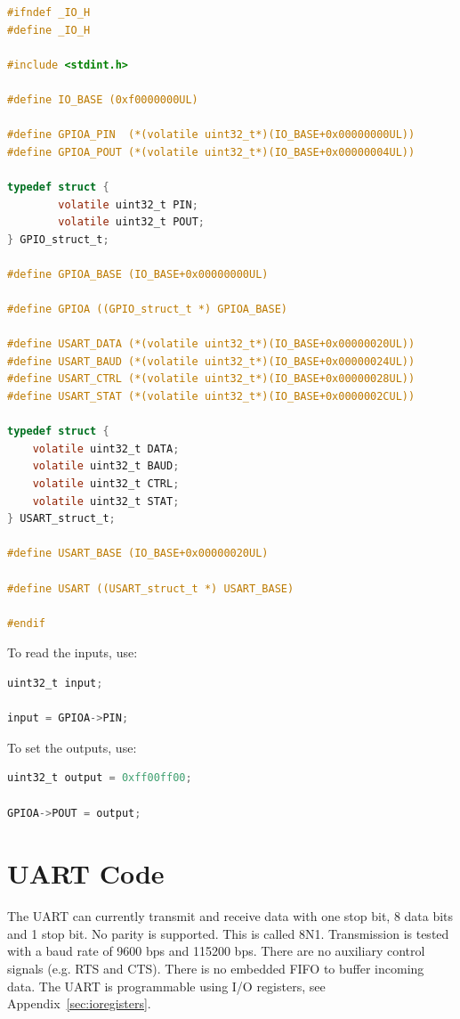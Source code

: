 \documentclass[12pt]{article}
\begin{document}
\begin{lstlisting}[language=C]
#ifndef _IO_H
#define _IO_H

#include <stdint.h>

#define IO_BASE (0xf0000000UL)

#define GPIOA_PIN  (*(volatile uint32_t*)(IO_BASE+0x00000000UL))
#define GPIOA_POUT (*(volatile uint32_t*)(IO_BASE+0x00000004UL))

typedef struct {
        volatile uint32_t PIN;
        volatile uint32_t POUT;
} GPIO_struct_t;

#define GPIOA_BASE (IO_BASE+0x00000000UL)

#define GPIOA ((GPIO_struct_t *) GPIOA_BASE)

#define USART_DATA (*(volatile uint32_t*)(IO_BASE+0x00000020UL))
#define USART_BAUD (*(volatile uint32_t*)(IO_BASE+0x00000024UL))
#define USART_CTRL (*(volatile uint32_t*)(IO_BASE+0x00000028UL))
#define USART_STAT (*(volatile uint32_t*)(IO_BASE+0x0000002CUL))

typedef struct {
	volatile uint32_t DATA;
	volatile uint32_t BAUD;
	volatile uint32_t CTRL;
	volatile uint32_t STAT;
} USART_struct_t;

#define USART_BASE (IO_BASE+0x00000020UL)

#define USART ((USART_struct_t *) USART_BASE)

#endif
\end{lstlisting}

To read the inputs, use:

\begin{lstlisting}[language=C]
uint32_t input;

input = GPIOA->PIN;
\end{lstlisting}

To set the outputs, use:

\begin{lstlisting}[language=C]
uint32_t output = 0xff00ff00;

GPIOA->POUT = output;
\end{lstlisting}

\section{UART Code}

The UART can currently transmit and receive data with one stop bit, 8 data bits and 1 stop bit. No parity is supported. This is called 8N1. Transmission is tested with a baud rate of 9600 bps and 115200 bps. There are no auxiliary control signals (e.g. RTS and CTS). There is no embedded FIFO to buffer incoming data. The UART is programmable using I/O registers, see Appendix~\ref{sec:ioregisters}.
\end{document}
